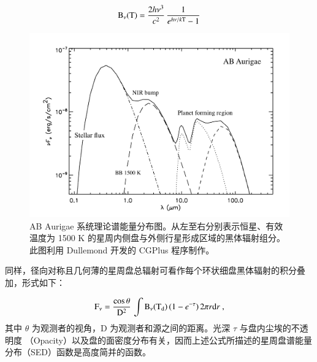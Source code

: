 \begin{equation} \label{eq:blackbody}
\mathrm{B}_\nu (\mathrm{T}) = \frac{2h\nu^3}{c^2} \, \frac{1}{e^{h\nu / k\mathrm{T}}-1}
\end{equation} %

\begin{figure}[t!]
\centering
\includegraphics[width=1.0\textwidth]{figures/chapter3/f3_youngdisc.pdf}
\caption[AB Aurigae 系统理论谱能量分布图。从左至右分别表示恒星、有效温度为 1500 K 的星周内侧盘与外侧行星形成区域的黑体辐射组分。该图利用 Dullemond 开发的 CGPlus 程序制作。]{AB Aurigae 系统理论谱能量分布图。从左至右分别表示恒星、有效温度为 1500 K 的星周内侧盘与外侧行星形成区域的黑体辐射组分。此图利用 Dullemond 开发的 CGPlus 程序\footnotemark[1]制作。}
\label{fig:transdiscsed}
\end{figure}

同样，径向对称且几何薄的星周盘总辐射可看作每个环状细盘黑体辐射的积分叠加，形式如下：

\begin{equation} \label{eq:diskrad}
\mathrm{F}_\nu = \frac{\cos \theta}{\mathrm{D}^2} \, \int \mathrm{B}_\nu (\mathrm{T}_\mathrm{d}) \, ( 1-e^{-\tau} ) \, 2\pi r \mathrm{d} r \ ,  
\end{equation} %
其中 $\theta$ 为观测者的视角，D 为观测者和源之间的距离。光深 $\tau$ 与盘内尘埃的不透明度
（Opacity）以及盘的面密度分布有关，因而上述公式所描述的星周盘谱能量分布（SED）函数是高度简并的函数。




